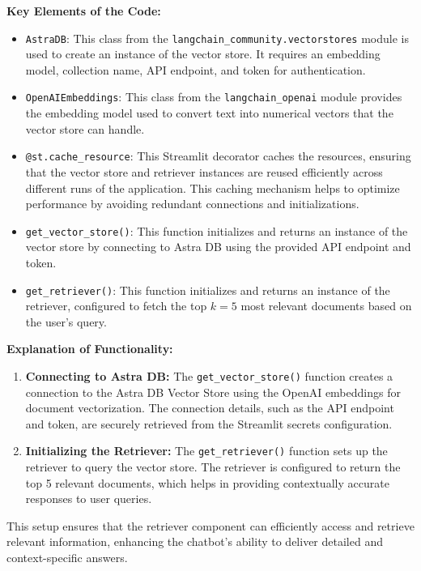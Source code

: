 \textbf{Key Elements of the Code:}
\begin{itemize}
    \item \texttt{AstraDB}: This class from the \texttt{langchain\_community.vectorstores} module is used to create an instance of the vector store. It requires an embedding model, collection name, API endpoint, and token for authentication.
    \item \texttt{OpenAIEmbeddings}: This class from the \texttt{langchain\_openai} module provides the embedding model used to convert text into numerical vectors that the vector store can handle.
    \item \texttt{@st.cache\_resource}: This Streamlit decorator caches the resources, ensuring that the vector store and retriever instances are reused efficiently across different runs of the application. This caching mechanism helps to optimize performance by avoiding redundant connections and initializations.
    \item \texttt{get\_vector\_store()}: This function initializes and returns an instance of the vector store by connecting to Astra DB using the provided API endpoint and token.
    \item \texttt{get\_retriever()}: This function initializes and returns an instance of the retriever, configured to fetch the top \(k = 5\) most relevant documents based on the user's query.
\end{itemize}

\textbf{Explanation of Functionality:}
\begin{enumerate}
    \item \textbf{Connecting to Astra DB:} The \texttt{get\_vector\_store()} function creates a connection to the Astra DB Vector Store using the OpenAI embeddings for document vectorization. The connection details, such as the API endpoint and token, are securely retrieved from the Streamlit secrets configuration.
    \item \textbf{Initializing the Retriever:} The \texttt{get\_retriever()} function sets up the retriever to query the vector store. The retriever is configured to return the top 5 relevant documents, which helps in providing contextually accurate responses to user queries.
\end{enumerate}

This setup ensures that the retriever component can efficiently access and retrieve relevant information, enhancing the chatbot's ability to deliver detailed and context-specific answers.

